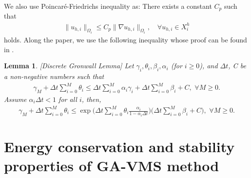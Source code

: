 \documentclass[10pt]{article}%
\numberwithin{equation}{section}
\newtheorem{lemma}{Lemma}[section]
\begin{document}
We also use Poincar\'e-Friedrichs inequality as: There exists a constant $C_p$ such that
\begin{eqnarray}
\|u_{h,i}\|_{\Omega_i}\leq C_p\|\nabla u_{h,i}\|_{\Omega_i},\quad \forall u_{h,i} \in X_i^h
\end{eqnarray}
holds.
Along the paper, we use the following inequality whose proof can be found in \cite{HR86}.
\begin{lemma}\label{gron}[Discrete Gronwall Lemma]
	Let $\gamma_i,\theta_i,\beta_i,\alpha_i$ (for $i\geq 0$), and $\Delta t$, C be a non-negative numbers such that
	\begin{eqnarray*}
		\gamma_M +\Delta t \sum_{i=0}^{M} \theta_i \leq \Delta t \sum_{i=0}^{M} \alpha_i\gamma_i +\Delta t \sum_{i=0}^{M} \beta_i + C,\, \, \forall M\geq 0.
	\end{eqnarray*}
	Assume $\alpha_i\Delta t <1$ for all $i$, then,
	\begin{eqnarray*}
		\gamma_M +\Delta t \sum_{i=0}^{M} \theta_i \leq \exp\Bigg(\Delta t \sum_{i=0}^{M}\theta_i \frac{\alpha_i}{1-\alpha_i\Delta t }\Bigg) \Bigg(\Delta t \sum_{i=0}^{M} \beta_i + C\Bigg),\, \, \forall M\geq 0.
	\end{eqnarray*}
\end{lemma}











\section{Energy conservation and stability properties of GA-VMS method }
\end{document}
